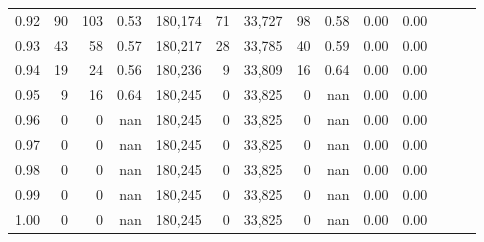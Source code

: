 \begin{tabular}{rrrrrrrrrrrrrr}
0.92 &     90 &  103 &  0.53 &  180,174 &       71 &  33,727 &      98 &  0.58 &  0.00 &      0.00 \\
0.93 &     43 &   58 &  0.57 &  180,217 &       28 &  33,785 &      40 &  0.59 &  0.00 &      0.00 \\
0.94 &     19 &   24 &  0.56 &  180,236 &        9 &  33,809 &      16 &  0.64 &  0.00 &      0.00 \\
0.95 &      9 &   16 &  0.64 &  180,245 &        0 &  33,825 &       0 &   nan &  0.00 &      0.00 \\
0.96 &      0 &    0 &   nan &  180,245 &        0 &  33,825 &       0 &   nan &  0.00 &      0.00 \\
0.97 &      0 &    0 &   nan &  180,245 &        0 &  33,825 &       0 &   nan &  0.00 &      0.00 \\
0.98 &      0 &    0 &   nan &  180,245 &        0 &  33,825 &       0 &   nan &  0.00 &      0.00 \\
0.99 &      0 &    0 &   nan &  180,245 &        0 &  33,825 &       0 &   nan &  0.00 &      0.00 \\
1.00 &      0 &    0 &   nan &  180,245 &        0 &  33,825 &       0 &   nan &  0.00 &      0.00 \\
\bottomrule
\end{tabular}
